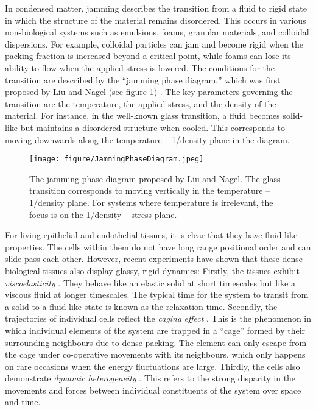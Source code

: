 \documentclass[a4paper,12pt]{article}
\begin{document}
In condensed matter, jamming describes the transition from a fluid to rigid state in which the structure of the material remains disordered. This occurs in various non-biological systems such as emulsions, foams, granular materials, and colloidal dispersions\cite{hecke2010}. For example, colloidal particles can jam and become rigid when the packing fraction is increased beyond a critical point, while foams can lose its ability to flow when the applied stress is lowered. The conditions for the transition are described by the ``jamming phase diagram,'' which was first proposed by Liu and Nagel (see figure \ref{fig:JammingPhaseDiagram}) \cite{liu1998}. The key parameters governing the transition are the temperature, the applied stress, and the density of the material. For instance, in the well-known glass transition, a fluid becomes solid-like but maintains a disordered structure when cooled. This corresponds to moving downwards along the temperature -- 1/density plane in the diagram. 

\begin{figure}[h]
\centering
\texttt{[image: figure/JammingPhaseDiagram.jpeg]}
\caption{The jamming phase diagram proposed by Liu and Nagel. The glass transition corresponds to moving vertically in the temperature -- 1/density plane. For systems where temperature is irrelevant, the focus is on the 1/density -- stress plane. }
\label{fig:JammingPhaseDiagram}
\end{figure}

For living epithelial and endothelial tissues, it is clear that they have fluid-like properties. The cells within them do not have long range positional order and can slide pass each other. However, recent experiments have shown that these dense biological tissues also display glassy, rigid dynamics: Firstly, the tissues exhibit \emph{viscoelasticity} \cite{schoetz2013}. They behave like an elastic solid at short timescales but like a viscous fluid at longer timescales. The typical time for the system to transit from a solid to a fluid-like state is known as the relaxation time. Secondly, the trajectories of individual cells reflect the \emph{caging effect} \cite{schoetz2013}. This is the phenomenon in which individual elements of the system are trapped in a ``cage'' formed by their surrounding neighbours due to dense packing. The element can only escape from the cage under co-operative movements with its neighbours, which only happens on rare occasions when the energy fluctuations are large. Thirdly, the cells also demonstrate \emph{dynamic heterogeneity} \cite{angelini2010}. This refers to the strong disparity in the movements and forces between individual constituents of the system over space and time.  
\end{document}
